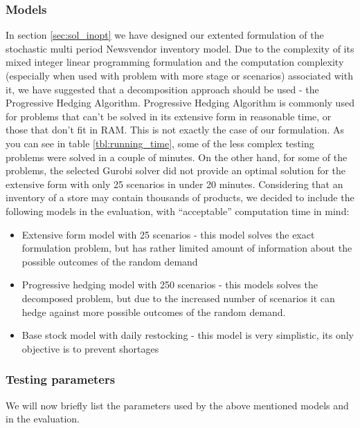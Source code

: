 \documentclass[11pt,a4paper]{article}
\begin{document}
\subsubsection{Models}
\label{eval:models_inv}
In section \ref{sec:sol_inopt} we have designed our extented formulation of the stochastic multi period Newsvendor inventory model. Due to the complexity of its mixed integer linear programming formulation and the computation complexity (especially when used with problem with more stage or scenarios) associated with it, we have suggested that a decomposition approach should be used - the Progressive Hedging Algorithm. Progressive Hedging Algorithm is commonly used for problems that can't be solved in its extensive form in reasonable time, or those that don't fit in RAM. This is not exactly the case of our formulation. As you can see in table \ref{tbl:running_time}, some of the less complex testing problems were solved in a couple of minutes. On the other hand, for some of the problems, the selected Gurobi solver did not provide an optimal solution for the extensive form with only 25 scenarios in under 20 minutes. Considering that an inventory of a store may contain thousands of products, we decided to include the following models in the evaluation, with ``acceptable'' computation time in mind:

\begin{itemize}
\item Extensive form model with 25 scenarios - this model solves the exact formulation problem, but has rather limited amount of information about the possible outcomes of the random demand
\item Progressive hedging model with 250 scenarios - this models solves the decomposed problem, but due to the increased number of scenarios it can hedge against more possible outcomes of the random demand.
\item Base stock model with daily restocking - this model is very simplistic, its only objective is to prevent shortages
\end{itemize}




\subsubsection{Testing parameters}
We will now briefly list the parameters used by the above mentioned models and in the evaluation.
\end{document}
